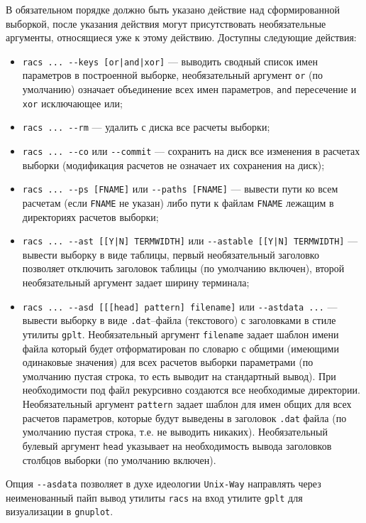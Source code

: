 В обязательном порядке должно быть указано действие над сформированной выборкой, после указания действия могут присутствовать необязательные аргументы,
относящиеся уже к этому действию. Доступны следующие действия:
\begin{itemize}
\item \verb'racs ... --keys [or|and|xor]' --- выводить сводный список имен параметров в построенной выборке, необязательный аргумент \verb'or' (по умолчанию)
  означает объединение всех имен параметров, \verb'and' пересечение и \verb'xor' исключающее или;
\item \verb'racs ... --rm' --- удалить с диска все расчеты выборки;
\item \verb'racs ... --co' или \verb'--commit' --- сохранить на диск все изменения в расчетах выборки (модификация расчетов не означает их сохранения на диск);
\item \verb'racs ... --ps [FNAME]' или \verb'--paths [FNAME]' --- вывести пути ко всем расчетам (если \verb'FNAME' не указан) либо пути
  к файлам \verb'FNAME' лежащим в директориях расчетов выборки;
\item \verb'racs ... --ast [[Y|N] TERMWIDTH]' или \verb'--astable [[Y|N] TERMWIDTH]' --- вывести выборку в виде таблицы,
  первый необязательный заголовко позволяет отключить заголовок таблицы (по умолчанию включен), второй необязательный аргумент задает ширину терминала;
\item \verb|racs ... --asd [[[head] pattern] filename]| или \verb'--astdata ...' --- вывести выборку в виде \verb'.dat'--файла (текстового)
  с заголовками в стиле утилиты \verb'gplt'. Необязательный аргумент \verb'filename' задает шаблон имени файла который будет отформатирован по словарю с
  общими (имеющими одинаковые значения) для всех расчетов выборки параметрами (по умолчанию пустая строка, то есть выводит на стандартный вывод).
  При необходимости под файл рекурсивно создаются все необходимые директории.
  Необязательный аргумент \verb'pattern' задает шаблон для имен общих для всех расчетов параметров, которые будут выведены в заголовок \verb'.dat' файла (по умолчанию пустая строка, т.е. не выводить никаких). Необязательный булевый аргумент \verb'head' указывает на необходимость вывода заголовков столбцов выборки (по умолчанию включен).
\end{itemize}
Опция \verb'--asdata' позволяет в духе идеологии \verb'Unix-Way' направлять через неименованный пайп вывод утилиты \verb'racs' на вход утилите \verb'gplt' для визуализации в \verb'gnuplot'.

